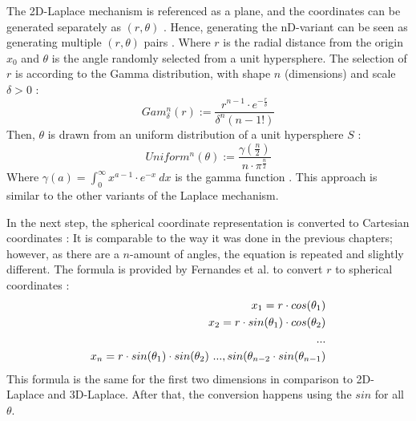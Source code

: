 The 2D-Laplace mechanism is referenced as a plane, and the coordinates can be generated separately as $(r, \theta)$ \citep{fernandes_generalised_2019,DBLP:journals/corr/abs-1212-1984}.
Hence, generating the nD-variant can be seen as generating multiple $(r, \theta)$ pairs \citep{fernandes_generalised_2019}.
Where $r$ is the radial distance from the origin $x_0$ and $\theta$ is the angle randomly selected from a unit hypersphere.
The selection of $r$ is according to the Gamma distribution, with shape $n$ (dimensions) and scale $\delta > 0$ \citep{fernandes_generalised_2019}:
\begin{equation}
  Gam^n_\delta(r) := \frac{r^{n-1}\cdot e^{-\frac{r}{\delta}}}{\delta^n(n-1!)}
  \label{eq:generate_r_for_nd_laplace}
\end{equation}
Then, $\theta$ is drawn from an uniform distribution of a unit hypersphere $S$ \citep{fernandes_generalised_2019}:
\begin{equation}
  Uniform^n(\theta) := \frac{\gamma(\frac{n}{2})}{n \cdot \pi ^{\frac{n}{2}}}
  \label{eq:generate_theta_for_nd_laplace}
\end{equation}
Where $\gamma(a) = \int^\infty_0 x^{a-1} \cdot e^{-x} \ dx$ is the gamma function \citep{fernandes_generalised_2019}.
This approach is similar to the other variants of the Laplace mechanism.

In the next step, the spherical coordinate representation is converted to Cartesian coordinates \citep{fernandes_generalised_2019}:
It is comparable to the way it was done in the previous chapters; however, as there are a $n$-amount of angles, the equation is repeated and slightly different.
The formula is provided by Fernandes et al. to convert $r$ to spherical coordinates \citep{fernandes_generalised_2019}:
\begin{align}
  x_1 = r \cdot cos (\theta_1) \notag                                      \\
  x_2 = r \cdot sin (\theta_1) \cdot cos (\theta_2)                        \notag \\
  ... \notag \\
  x_n = r \cdot sin(\theta_{1}) \cdot sin(\theta_{2}) \ ..., sin(\theta_{n-2} \cdot sin(\theta_{n-1})
  \label{eq:nd-laplace-cartesian}
\end{align}
This formula is the same for the first two dimensions in comparison to 2D-Laplace and 3D-Laplace. After that, the conversion happens using the $sin$ for all $\theta$.

